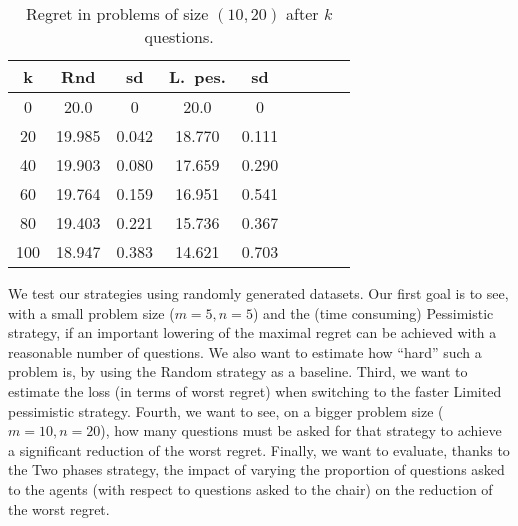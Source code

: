 \begin{table}
	\begin{center}
		\begin{tabular}{S[table-figures-integer=2, table-number-alignment = right, table-figures-decimal=0]S[table-number-alignment = right]@{ ± }S[table-number-alignment = left]S[table-number-alignment = right]@{ ± }S[table-number-alignment = left]S[table-number-alignment = right]@{ ± }S[table-number-alignment = left]S[table-number-alignment = right]@{ ± }S[table-number-alignment = left]}
			\toprule
			{k} & {Rnd} & {sd} & {L.\ pes.} & {sd} \\
			 & 20.0 & 0 & 20.0 & 0 \\
			20 & 19.985 & 0.042 & 18.770 & 0.111 \\
			40 & 19.903 & 0.080 & 17.659 & 0.290 \\
			60 & 19.764 & 0.159 & 16.951 & 0.541 \\
			80 & 19.403 & 0.221 & 15.736 & 0.367 \\
			100 & 18.947 & 0.383 & 14.621 & 0.703 \\
			\bottomrule
		\end{tabular}
	\end{center}
	\caption{Regret in problems of size $(10, 20)$ after $k$ questions.}
	\label{fig:1020}
\end{table}

We test our strategies using randomly generated datasets. %
Our first goal is to see, with a small problem size ($m = 5, n = 5$) and the (time consuming) Pessimistic strategy, if an important lowering of the maximal regret can be achieved with a reasonable number of questions. We also want to estimate how “hard” such a problem is, by using the Random strategy as a baseline. Third, we want to estimate the loss (in terms of worst regret) when switching to the faster Limited pessimistic strategy. Fourth, we want to see, on a bigger problem size ($m = 10, n = 20$), how many questions must be asked for that strategy to achieve a significant reduction of the worst regret. Finally, we want to evaluate, thanks to the Two phases strategy, the impact of varying the proportion of questions asked to the agents (with respect to questions asked to the chair) on the reduction of the worst regret.

